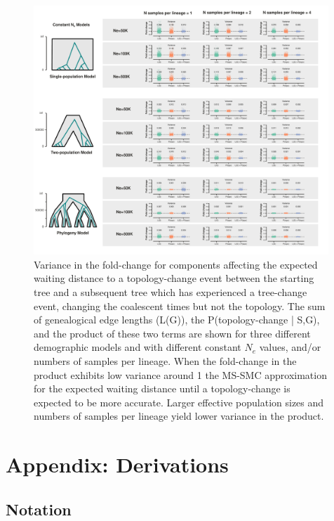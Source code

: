 \documentclass[11pt]{article}
\begin{document}
\begin{figure}[p]
	\centering
	\includegraphics[width=0.99\textwidth]{figures/FigSX-bias.pdf}
	\caption{
		Variance in the fold-change for components affecting the expected waiting 
		distance to a topology-change event between the starting tree and a subsequent
		tree which has experienced a tree-change event, changing the coalescent times
		but not the topology. The sum of genealogical edge lengths (L(G)), the 
		P(topology-change | S,G), and the product of these two terms are shown for
		three different demographic models and with different constant $N_e$ values, 
		and/or numbers of samples per lineage.
		When the fold-change in the product exhibits low variance around 1 the 
		MS-SMC approximation for the expected waiting distance until a topology-change 
		is expected to be more accurate. Larger effective population sizes and 
		numbers of samples per lineage yield lower variance in the product.
	}
     \label{fig:figS-bias-topo}
\end{figure}


\section{Appendix: Derivations}

\subsection{Notation}
\end{document}
